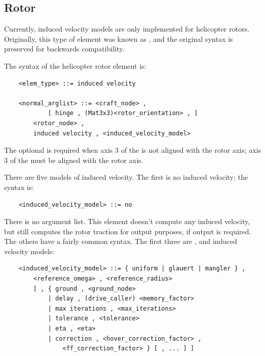 \subsection{Rotor}
\label{sec:EL:INDVEL:ROTOR}
Currently, induced velocity models are only implemented
for helicopter rotors.
Originally, this type of element was known as ,
and the original syntax is preserved for backwards compatibility.

The syntax of the helicopter rotor  element is:
\begin{verbatim}
    <elem_type> ::= induced velocity

    <normal_arglist> ::= <craft_node> ,
            [ hinge , (Mat3x3)<rotor_orientation> , ]
        <rotor_node> ,
        induced velocity , <induced_velocity_model>
\end{verbatim}
The optional  is required when axis 3 
of the  is not aligned with the rotor axis; axis 3
of the  must be aligned with the rotor axis.

There are five models of induced velocity. 
The first is no induced velocity; the syntax is:
\begin{verbatim}
    <induced_velocity_model> ::= no
\end{verbatim}
There is no argument list. This element doesn't compute any induced
velocity, but still computes the rotor traction for output purposes,
if output is required.
The others have a fairly common syntax.  The first three are
,  and  induced velocity
models:
\begin{verbatim}
    <induced_velocity_model> ::= { uniform | glauert | mangler } , 
        <reference_omega> , <reference_radius> 
        [ , { ground , <ground_node>
            | delay , (drive_caller) <memory_factor>
            | max iterations , <max_iterations>
            | tolerance , <tolerance>
            | eta , <eta>
            | correction , <hover_correction_factor> ,
                <ff_correction_factor> } [ , ... ] ]
\end{verbatim}

